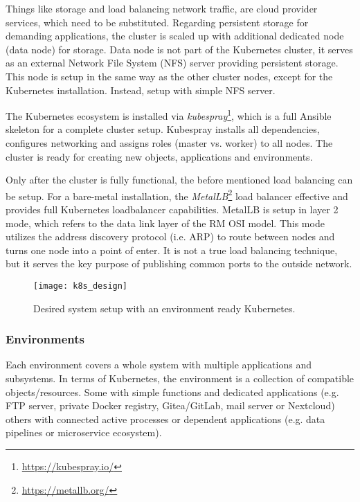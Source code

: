 Things like storage and load balancing network traffic, are cloud provider services, which need to be substituted. Regarding persistent storage for demanding applications, the cluster is scaled up with additional dedicated node (data node) for storage. Data node is not part of the Kubernetes cluster, it serves as an external Network File System (NFS) server providing persistent storage. This node is setup in the same way as the other cluster nodes, except for the Kubernetes installation. Instead, setup with simple NFS server.

The Kubernetes ecosystem is installed via \textit{kubespray}\footnote{\url{https://kubespray.io/}}, which is a full Ansible skeleton for a complete cluster setup. Kubespray installs all dependencies, configures networking and assigns roles (master vs. worker) to all nodes. The cluster is ready for creating new objects, applications and environments.

Only after the cluster is fully functional, the before mentioned load balancing can be setup. For a bare-metal installation, the \textit{MetalLB}\footnote{\url{https://metallb.org/}} load balancer effective and provides full Kubernetes loadbalancer capabilities. MetalLB is setup in layer 2 mode, which refers to the data link layer of the RM OSI model. This mode utilizes the address discovery protocol (i.e. ARP) to route between nodes and turns one node into a point of enter. It is not a true load balancing technique, but it serves the key purpose of publishing common ports to the outside network.

\begin{figure}[h]
	\centering
	\texttt{[image: k8s\_design]}
	\caption{Desired system setup with an environment ready Kubernetes.}
	\label{image:design:k8s}
\end{figure}

\subsubsection*{Environments \label{design:env-arch:k8s:envs}}
Each environment covers a whole system with multiple applications and subsystems. In terms of Kubernetes, the environment is a collection of compatible objects/resources. Some with simple functions and dedicated applications (e.g. FTP server, private Docker registry, Gitea/GitLab, mail server or Nextcloud) others with connected active processes or dependent applications (e.g. data pipelines or microservice ecosystem). 

